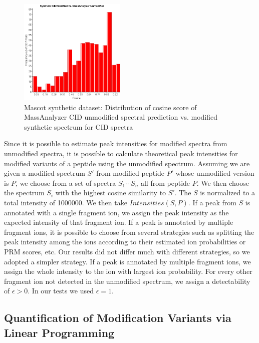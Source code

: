 \begin{figure}[htbp]
\centering
\includegraphics[width=2in,height=2in]{fig/phospho/cosine_mod_vs_massanalyzer_synthetic_cid.png}
\caption{Mascot synthetic dataset: Distribution of cosine score of MassAnalyzer CID unmodified spectral prediction vs. modified synthetic spectrum for CID spectra}
\label{fig:CosineSynthetic}
\end{figure}

Since it is possible to estimate peak intensities for modified spectra from unmodified spectra, it is possible to calculate theoretical peak intensities for modified variants of a peptide using the unmodified spectrum. Assuming we are given a modified spectrum $S'$ from modified peptide $P'$ whose unmodified version is $P$, we choose from a set of spectra $S_1 \cdots S_n$ all from peptide $P$. We then choose the spectrum $S_{i}$ with the highest cosine similarity to $S'$. The $S$ is normalized to a total intensity of 1000000. We then take $Intensities(S,P)$. If a peak from $S$ is annotated with a single fragment ion, we assign the peak intensity as the expected intensity of that fragment ion. If a peak is annotated by 
multiple fragment ions, it is possible to choose from several strategies such as splitting the peak intensity among the ions according to their estimated ion probabilities or PRM scores, etc. Our results did not differ much with different strategies, so we adopted a simpler strategy. If a peak is annotated by multiple fragment ions, we assign the whole intensity to the ion
with largest ion probability. For every other fragment ion not detected in the unmodified spectrum, we assign a detectability of $\epsilon > 0$. In our tests we used $\epsilon=1$.

\subsection{Quantification of Modification Variants via Linear Programming}\label{sec:quantificationSupplemental}

